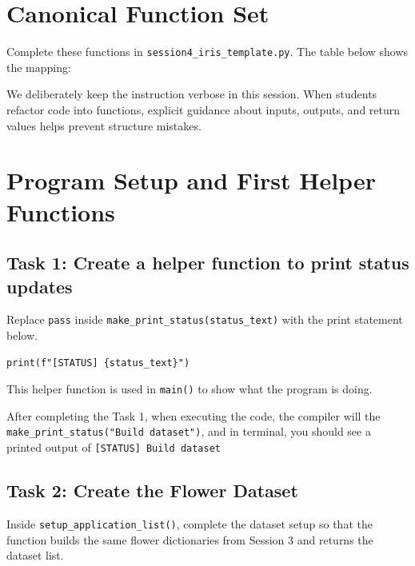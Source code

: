 \section{Canonical Function Set}
Complete these functions in \texttt{session4\_iris\_template.py}. The table below shows the mapping:



\begin{tcolorbox}[title=Good Practice]
We deliberately keep the instruction verbose in this session. When students refactor code into functions, explicit guidance about inputs, outputs, and return values helps prevent structure mistakes.
\end{tcolorbox}
\section{Program Setup and First Helper Functions}

\subsection{Task 1: Create a helper function to print status updates}
\begin{tcolorbox}[title=Task 1: Create a helper function to print status updates]
Replace \texttt{pass} inside \texttt{make\_print\_status(status\_text)} with the print statement below.
\end{tcolorbox}

\begin{verbatim}
print(f"[STATUS] {status_text}")
\end{verbatim}

This helper function is used in \texttt{main()} to show what the program is doing.

\begin{tcolorbox}[title=Checkpoint]
After completing the Task 1, when executing the code, the compiler will the \texttt{make\_print\_status("Build dataset")}, and in terminal, you should see a printed output of \:
\texttt{[STATUS] Build dataset}
\end{tcolorbox}

\subsection{Task 2: Create the Flower Dataset}
\begin{tcolorbox}[title=Task 2: Create the flower dataset]

Inside \texttt{setup\_application\_list()}, complete the dataset setup so that the function builds the same flower dictionaries from Session 3 and returns the dataset list.
\end{tcolorbox}

